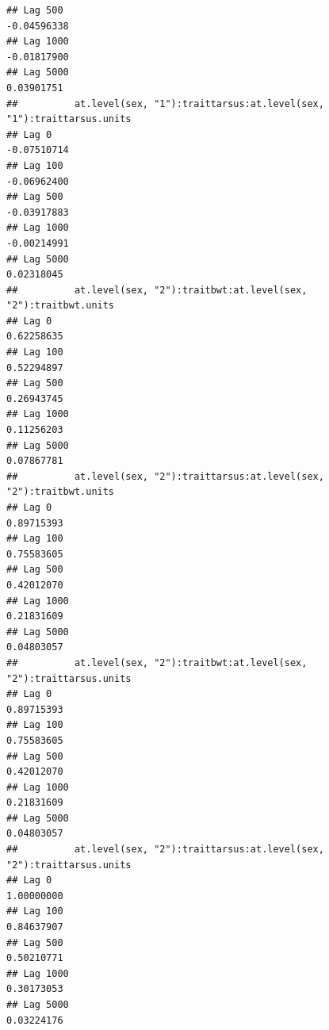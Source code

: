 \documentclass[
  12pt,
]{book}
\begin{document}
\begin{verbatim}
## Lag 500                                                       -0.04596338
## Lag 1000                                                      -0.01817900
## Lag 5000                                                       0.03901751
##          at.level(sex, "1"):traittarsus:at.level(sex, "1"):traittarsus.units
## Lag 0                                                            -0.07510714
## Lag 100                                                          -0.06962400
## Lag 500                                                          -0.03917883
## Lag 1000                                                         -0.00214991
## Lag 5000                                                          0.02318045
##          at.level(sex, "2"):traitbwt:at.level(sex, "2"):traitbwt.units
## Lag 0                                                       0.62258635
## Lag 100                                                     0.52294897
## Lag 500                                                     0.26943745
## Lag 1000                                                    0.11256203
## Lag 5000                                                    0.07867781
##          at.level(sex, "2"):traittarsus:at.level(sex, "2"):traitbwt.units
## Lag 0                                                          0.89715393
## Lag 100                                                        0.75583605
## Lag 500                                                        0.42012070
## Lag 1000                                                       0.21831609
## Lag 5000                                                       0.04803057
##          at.level(sex, "2"):traitbwt:at.level(sex, "2"):traittarsus.units
## Lag 0                                                          0.89715393
## Lag 100                                                        0.75583605
## Lag 500                                                        0.42012070
## Lag 1000                                                       0.21831609
## Lag 5000                                                       0.04803057
##          at.level(sex, "2"):traittarsus:at.level(sex, "2"):traittarsus.units
## Lag 0                                                             1.00000000
## Lag 100                                                           0.84637907
## Lag 500                                                           0.50210771
## Lag 1000                                                          0.30173053
## Lag 5000                                                          0.03224176
\end{verbatim}
\end{document}
